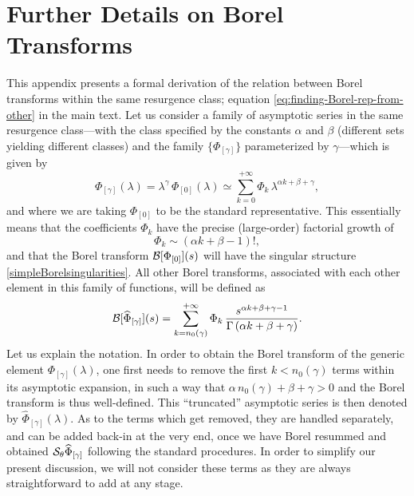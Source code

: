 \documentclass[11pt,a4paper]{article}
\newcommand{\CB}{{\cal B}}
\newcommand{\CS}{{\cal S}}
\newcommand{\be}{\begin{equation}}
\newcommand{\ee}{\end{equation}}
\begin{document}
\section{Further Details on Borel Transforms}\label{app:borel}


This appendix presents a formal derivation of the relation between Borel transforms within the same resurgence class; equation \eqref{eq:finding-Borel-rep-from-other} in the main text. Let us consider a family of asymptotic series in the same resurgence class---with the class specified by the constants $\alpha$ and $\beta$ (different sets yielding different classes) and the family $\{ \Phi_{[\gamma]} \}$ parameterized by $\gamma$---which is given by
%
\be
\label{eq:Family-res-funct-app}
\Phi_{[\gamma]} (\lambda) = \lambda^\gamma\, \Phi_{[0]} (\lambda) \simeq \sum_{k=0}^{+\infty} \Phi_k\, \lambda^{\alpha k + \beta + \gamma},
\ee
%
\noindent
and where we are taking $\Phi_{[0]}$ to be the standard representative. This essentially means that the coefficients $\Phi_k$ have the precise (large-order) factorial growth of
%
\be
\Phi_k \sim \left( \alpha k + \beta - 1 \right)!,
\ee
%
\noindent
and that the Borel transform $\CB [\Phi_{[0]}] (s)$ will have the singular structure \eqref{simpleBorelsingularities}. All other Borel transforms, associated with each other  element in this family of functions, will be defined as
%
\be
\CB [ \widehat{\Phi}_{[\gamma]} ] (s) = \sum_{k=n_0(\gamma)}^{+\infty} \Phi_k\, \frac{s^{\alpha k + \beta + \gamma - 1}}{\Gamma \left( \alpha k + \beta + \gamma \right)}.
\ee
%
\noindent
Let us explain the notation. In order to obtain the Borel transform of the generic element $\Phi_{[\gamma]} (\lambda)$, one first needs to remove the first $k<n_{0}(\gamma)$ terms within its asymptotic expansion, in such a way that $\alpha\, n_{0}(\gamma)+\beta+\gamma>0$ and the Borel transform is thus well-defined. This ``truncated'' asymptotic series is then denoted by $\widehat{\Phi}_{[\gamma]} (\lambda)$. As to the terms which get removed, they are handled separately, and can be added back-in at the very end, once we have Borel resummed and obtained $\CS_\theta \widehat{\Phi}_{[\gamma]}$ following the standard procedures. In order to simplify our present discussion, we will not consider these terms as they are always straightforward to add at any stage.
\end{document}
